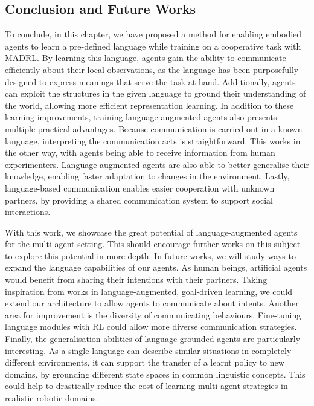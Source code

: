 
\subsection{Conclusion and Future Works}\label{sec:LAMAC:Discuss_FuturWorks}

To conclude, in this chapter, we have proposed a method for enabling embodied agents to learn a pre-defined language while training on a cooperative task with MADRL. By learning this language, agents gain the ability to communicate efficiently about their local observations, as the language has been purposefully designed to express meanings that serve the task at hand. Additionally, agents can exploit the structures in the given language to ground their understanding of the world, allowing more efficient representation learning. In addition to these learning improvements, training language-augmented agents also presents multiple practical advantages. Because communication is carried out in a known language, interpreting the communication acts is straightforward. This works in the other way, with agents being able to receive information from human experimenters. Language-augmented agents are also able to better generalise their knowledge, enabling faster adaptation to changes in the environment. Lastly, language-based communication enables easier cooperation with unknown partners, by providing a shared communication system to support social interactions. 

With this work, we showcase the great potential of language-augmented agents for the multi-agent setting. This should encourage further works on this subject to explore this potential in more depth. In future works, we will study ways to expand the language capabilities of our agents. As human beings, artificial agents would benefit from sharing their intentions with their partners. Taking inspiration from works in language-augmented, goal-driven learning, we could extend our architecture to allow agents to communicate about intents. Another area for improvement is the diversity of communicating behaviours. Fine-tuning language modules with RL could allow more diverse communication strategies. Finally, the generalisation abilities of language-grounded agents are particularly interesting. As a single language can describe similar situations in completely different environments, it can support the transfer of a learnt policy to new domains, by grounding different state spaces in common linguistic concepts. This could help to drastically reduce the cost of learning multi-agent strategies in realistic robotic domains. 

